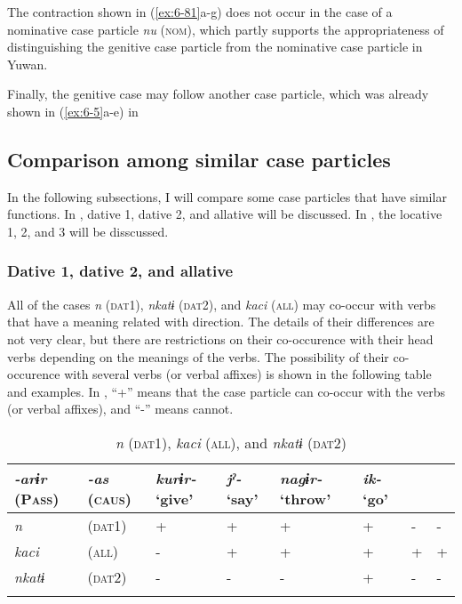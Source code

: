 The contraction shown in (\ref{ex:6-81}a-g) does not occur in the case of a nominative case particle \textit{nu} (\textsc{nom}), which partly supports the appropriateness of distinguishing the genitive case particle from the nominative case particle in Yuwan.

  Finally, the genitive case may follow another case particle, which was already shown in (\ref{ex:6-5}a-e) in 

\subsection{Comparison among similar case particles}

In the following subsections, I will compare some case particles that have similar functions. In , dative 1, dative 2, and allative will be discussed. In , the locative 1, 2, and 3 will be disscussed.

\subsubsection{Dative 1, dative 2, and allative}

All of the cases \textit{n} (\textsc{dat}1), \textit{nkatɨ} (\textsc{dat2}), and \textit{kaci} (\textsc{all}) may co-occur with verbs that have a meaning related with direction. The details of their differences are not very clear, but there are restrictions on their co-occurence with their head verbs depending on the meanings of the verbs. The possibility of their co-occurence with several verbs (or verbal affixes) is shown in the following table and examples. In , “+” means that the case particle can co-occur with the verbs (or verbal affixes), and “-” means cannot.

\begin{table}
\caption{\label{tab:key:42} \textit{n} (\textsc{dat}1), \textit{kaci} (\textsc{all}), and \textit{nkatɨ} (\textsc{dat2})}
\begin{tabularx}{\textwidth}{XXXXXXXX}
\lsptoprule
\textit{-arɨr} (P\textsc{ass}) & \textit{-as} (\textsc{caus}) & \textit{kurɨr-} ‘give’  &\textit{jˀ-} ‘say’  &\textit{nagɨr-} ‘throw’ & \textit{ik-} ‘go’\\
\midrule
\textit{n} &     (\textsc{dat}1) & + & + & + & + & - & -\\
\textit{kaci} &  (\textsc{all})  & - & + & + & + & + & +\\
\textit{nkatɨ} & (\textsc{dat}2) & - & - & - & + & - & -\\
\lspbottomrule
\end{tabularx}
\end{table}

